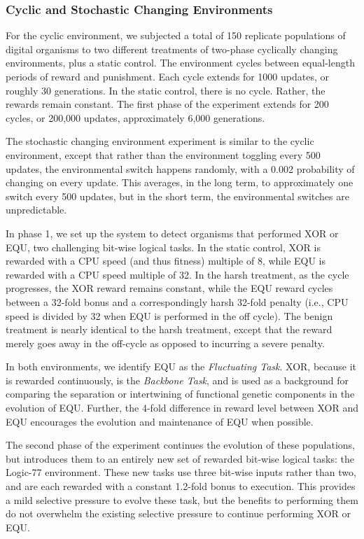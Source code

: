 \documentclass[PhD]{msu-thesis}
\begin{document}
\subsubsection{Cyclic and Stochastic Changing Environments}
For the cyclic environment, we subjected a total of 150 replicate populations of digital organisms to two different treatments of two-phase cyclically changing environments, plus a static control. The environment cycles between equal-length periods of reward and punishment. Each cycle extends for 1000 updates, or roughly 30 generations. In the static control, there is no cycle. Rather, the rewards remain constant. The first phase of the experiment extends for 200 cycles, or 200,000 updates, approximately 6,000 generations.

The stochastic changing environment experiment is similar to the cyclic environment, except that rather than the environment toggling every 500 updates, the environmental switch happens randomly, with a 0.002 probability of changing on every update. This averages, in the long term, to approximately one switch every 500 updates, but in the short term, the environmental switches are unpredictable.

In phase 1, we set up the system to detect organisms that performed XOR or EQU, two challenging bit-wise logical tasks. In the static control, XOR is rewarded with a CPU speed (and thus fitness) multiple of 8, while EQU is rewarded with a CPU speed multiple of 32. In the harsh treatment, as the cycle progresses, the XOR reward remains constant, while the EQU reward cycles between a 32-fold bonus and a correspondingly harsh 32-fold penalty (i.e., CPU speed is divided by 32 when EQU is performed in the off cycle). The benign treatment is nearly identical to the harsh treatment, except that the reward merely goes away in the off-cycle as opposed to incurring a severe penalty.

In both environments, we identify EQU as the \textit{Fluctuating Task}. XOR, because it is rewarded continuously, is the \textit{Backbone Task}, and is used as a background for comparing the separation or intertwining of functional genetic components in the evolution of EQU. Further, the 4-fold difference in reward level between XOR and EQU encourages the evolution and maintenance of EQU when possible.

The second phase of the experiment continues the evolution of these populations, but introduces them to an entirely new set of rewarded bit-wise logical tasks: the Logic-77 environment. These new tasks use three bit-wise inputs rather than two, and are each rewarded with a constant 1.2-fold bonus to execution. This provides a mild selective pressure to evolve these task, but the benefits to performing them do not overwhelm the existing selective pressure to continue performing XOR or EQU.
\end{document}
